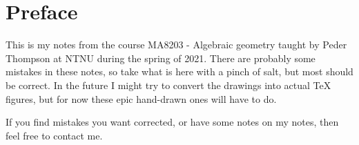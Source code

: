 \section*{Preface}
This is my notes from the course MA8203 - Algebraic geometry taught by Peder Thompson at NTNU during the spring of 2021. There are probably some mistakes in these notes, so take what is here with a pinch of salt, but most should be correct. In the future I might try to convert the drawings into actual \TeX{}  figures, but for now these epic hand-drawn ones will have to do. 

If you find mistakes you want corrected, or have some notes on my notes, then feel free to contact me. 